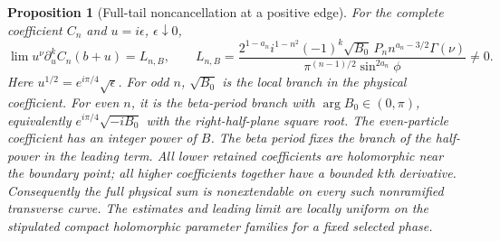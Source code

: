 \documentclass[11pt]{article}
\numberwithin{equation}{section}
\newtheorem{proposition}[theorem]{Proposition}
\theoremstyle{definition}
\begin{document}
\begin{proposition}[Full-tail noncancellation at a positive edge]
\label{prop:positive-edge}
For the complete coefficient $C_n$ and $u=i\epsilon$,
$\epsilon\downarrow0$,
\begin{equation}
 \lim u^\nu\partial_u^k C_n(b+u)=L_{n,B},\qquad
 L_{n,B}=
 \frac{2^{1-a_n}i^{1-n^2}(-1)^k\sqrt{B_0}\,P_n
         n^{a_n-3/2}\Gamma(\nu)}
      {\pi^{(n-1)/2}\sin^{2a_n}\phi}\ne0.
 \label{eq:positive-L}
\end{equation}
Here $u^{1/2}=e^{i\pi/4}\sqrt\epsilon$. For odd $n$, $\sqrt{B_0}$
is the local branch in the physical coefficient. For even
$n$, it is the beta-period branch with $\arg B_0\in(0,\pi)$,
equivalently $e^{i\pi/4}\sqrt{-iB_0}$ with the right-half-plane
square root. The even-particle coefficient has an integer power of
$B$. The beta period fixes the branch of the half-power in the leading
term.
All lower retained coefficients are
holomorphic near the boundary point; all higher coefficients together
have a bounded $k$th derivative. Consequently the full physical sum
is nonextendable on every such nonramified transverse curve.
The estimates and leading limit are locally uniform on the stipulated
compact holomorphic parameter families for a fixed selected phase.
\end{proposition}
\end{document}
